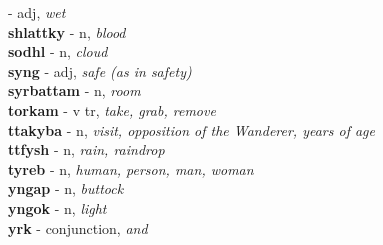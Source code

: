   - adj, \emph{wet}\\ \vspace{7pt}\textbf{shlattky}   - n, \emph{blood}\\ \vspace{7pt}\textbf{sodhl}   - n, \emph{cloud}\\ \vspace{7pt}\textbf{syng}   - adj, \emph{safe (as in safety)}\\ \vspace{7pt}\textbf{syrbattam}   - n, \emph{room}\\ \vspace{7pt}\textbf{torkam}   - v tr, \emph{take, grab, remove}\\ \vspace{7pt}\textbf{ttakyba}   - n, \emph{visit, opposition of the Wanderer, years of age}\\ \vspace{7pt}\textbf{ttfysh}   - n, \emph{rain, raindrop}\\ \vspace{7pt}\textbf{tyreb}   - n, \emph{human, person, man, woman}\\ \vspace{7pt}\textbf{yngap}   - n, \emph{buttock}\\ \vspace{7pt}\textbf{yngok}   - n, \emph{light}\\ \vspace{7pt}\textbf{yrk}   - conjunction, \emph{and}\\ \vspace{7pt}